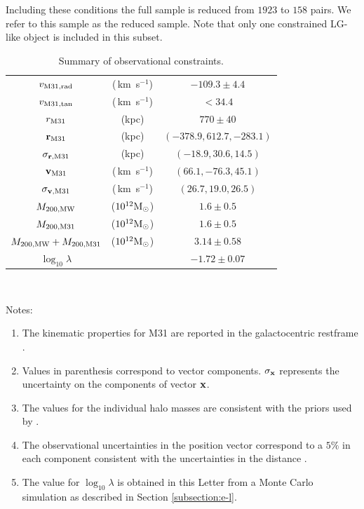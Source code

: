 \documentclass{emulateapj}
\newcommand{\kms}{\,km~s$^{-1}$}
\newcommand{\Msun}{{\ifmmode{{\rm {M_{\odot}}}}\else{${\rm{M_{\odot}}}$}\fi}}
\begin{document}
Including these conditions the full sample is reduced from $1923$
to $158$ pairs. We refer to this sample as the reduced sample. Note
that only one constrained LG-like object is included in this subset.


\begin{table}
\caption{Summary of observational constraints.}
\begin{center}
\begin{tabular}{ccc}\hline
$v_{\rm M31,rad}$ &(\kms) & $-109.3\pm 4.4$\\
$v_{\rm M31,tan}$ &(\kms) & $<34.4$\\
$r_{\rm M31}$ &(kpc) & $770\pm 40$\\
${\bf r}_{\rm M31}$ & (kpc) &$(-378.9, 612.7, -283.1)$\\
$\sigma_{{\bf r}, {\rm M31}}$ & (kpc) &$(-18.9, 30.6, 14.5)$\\
${\bf v}_{\rm M31}$ & (\kms) & $(66.1, -76.3, 45.1)$\\
$\sigma_{{\bf v},{\rm M31}}$ & (\kms) &$(26.7, 19.0, 26.5)$\\
$M_{\rm 200, MW}$ & ($10^{12}\Msun$) & $1.6\pm0.5$ \\
$M_{\rm 200, M31}$ & ($10^{12}\Msun$) & $1.6\pm0.5$ \\
$M_{\rm 200,MW} + M_{\rm 200, M31}$ & ($10^{12}\Msun$) & $3.14\pm 0.58$\\
$\log_{10}\lambda$& & $-1.72\pm 0.07$ \\\hline
\end{tabular}\\
\end{center}
\vspace{1mm}
Notes:\\
\begin{enumerate}
\item The kinematic
  properties for M31 are reported in the galactocentric restframe 
  \citep{vanderMarel12}. 

\item Values in parenthesis correspond to vector
  components. $\sigma_{\bf x}$ represents the uncertainty on the
  components of vector ${\bf x}$. 
\item The values for the individual halo
masses are consistent with the priors used by \cite{vanderMarel12}.


\item The observational uncertainties in the position vector
correspond to a $5\%$ in each component consistent with the
uncertainties in the distance \citep[see references
  in][]{vanderMarel08}.

\item The value for $\log_{10}\lambda$ is obtained in this Letter
from a Monte Carlo simulation as described in Section
\ref{subsection:e-l}. 
\end{enumerate}
\label{table:1}
\end{table}
\end{document}
